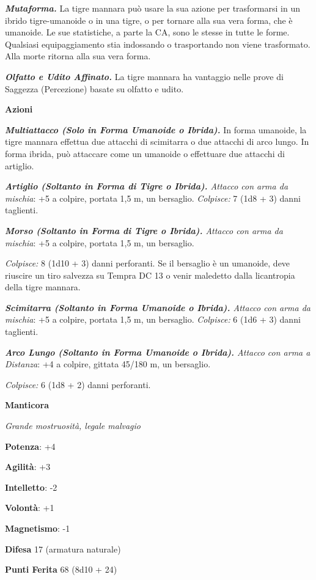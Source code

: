 \begin{multicols}{2}
\emph{\textbf{Mutaforma.}} La tigre mannara può usare la sua azione per
trasformarsi in un ibrido tigre-umanoide o in una tigre, o per tornare
alla sua vera forma, che è umanoide. Le sue statistiche, a parte la CA,
sono le stesse in tutte le forme. Qualsiasi equipaggiamento stia
indossando o trasportando non viene trasformato. Alla morte ritorna alla
sua vera forma.

\emph{\textbf{Olfatto e Udito Affinato.}} La tigre mannara ha vantaggio
nelle prove di Saggezza (Percezione) basate su olfatto e udito.

\textbf{Azioni}

\emph{\textbf{Multiattacco (Solo in Forma Umanoide o Ibrida).}} In forma
umanoide, la tigre mannara effettua due attacchi di scimitarra o due
attacchi di arco lungo. In forma ibrida, può attaccare come un umanoide
o effettuare due attacchi di artiglio.

\emph{\textbf{Artiglio (Soltanto in Forma di Tigre o Ibrida).} Attacco
con arma da mischia}: +5 a colpire, portata 1,5 m, un bersaglio.
\emph{Colpisce:} 7 (1d8 + 3) danni taglienti.

\emph{\textbf{Morso (Soltanto in Forma di Tigre o Ibrida).} Attacco con
arma da mischia}: +5 a colpire, portata 1,5 m, un bersaglio.

\emph{Colpisce:} 8 (1d10 + 3) danni perforanti. Se il bersaglio è un
umanoide, deve riuscire un tiro salvezza su Tempra DC 13 o venir
maledetto dalla licantropia della tigre mannara.

\emph{\textbf{Scimitarra (Soltanto in Forma Umanoide o Ibrida).} Attacco
con arma da mischia}: +5 a colpire, portata 1,5 m, un bersaglio.
\emph{Colpisce:} 6 (1d6 + 3) danni taglienti.

\emph{\textbf{Arco Lungo (Soltanto in Forma Umanoide o Ibrida).} Attacco
con arma a Distanza}: +4 a colpire, gittata 45/180 m, un bersaglio.

\emph{Colpisce:} 6 (1d8 + 2) danni perforanti.

\textbf{Manticora}

\emph{Grande mostruosità, legale malvagio}

\textbf{Potenza}: +4

\textbf{Agilità}: +3

\textbf{Intelletto}: -2

\textbf{Volontà}: +1

\textbf{Magnetismo}: -1

\textbf{Difesa} 17 (armatura naturale)

\textbf{Punti Ferita} 68 (8d10 + 24)


\end{multicols}
